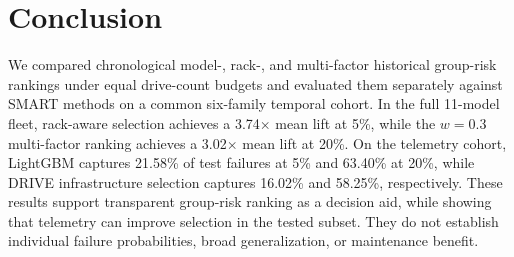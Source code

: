 \documentclass[conference]{IEEEtran}
\begin{document}
\FloatBarrier
\section{Conclusion}
We compared chronological model-, rack-, and multi-factor historical group-risk
rankings under equal drive-count budgets and evaluated them separately against SMART
methods on a common six-family temporal cohort. In the full 11-model fleet, rack-aware
selection achieves a 3.74$\times$ mean lift at 5\%, while the $w=0.3$ multi-factor
ranking achieves a 3.02$\times$ mean lift at 20\%. On the telemetry cohort, LightGBM captures 21.58\% of test failures at 5\% and 63.40\%
at 20\%, while DRIVE infrastructure selection captures 16.02\% and 58.25\%,
respectively. These results support transparent group-risk ranking as a decision aid,
while showing that telemetry can improve selection in the tested subset. They do not
establish individual failure probabilities, broad generalization, or maintenance
benefit.



\end{document}
